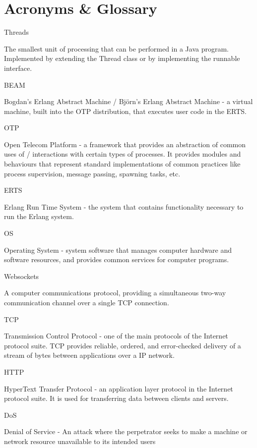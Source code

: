 \documentclass[]{project_plan}
\begin{document}
\chapter{Acronyms \& Glossary}

Threads

The smallest unit of processing that can be performed in a Java program. Implemented by extending the
Thread class or by implementing the runnable interface.

BEAM

Bogdan's Erlang Abstract Machine / Björn's Erlang Abstract Machine - a virtual machine, built into the OTP
distribution, that executes user code in the ERTS.

OTP

Open Telecom Platform - a framework that provides an abstraction of common uses of / interactions with
certain types of processes. It provides modules and behaviours that represent standard implementations of
common practices like process supervision, message passing, spawning tasks, etc.

ERTS

Erlang Run Time System - the system that contains functionality necessary to run the Erlang system.

OS

Operating System - system software that manages computer hardware and software resources, and
provides common services for computer programs.

Websockets

A computer communications protocol, providing a simultaneous two-way communication channel
over a single TCP connection.

TCP

Transmission Control Protocol - one of the main protocols of the Internet protocol suite. TCP provides
reliable, ordered, and error-checked delivery of a stream of bytes between applications over a IP network.

HTTP

HyperText Transfer Protocol - an application layer protocol in the Internet protocol suite.
It is used for transferring data between clients and servers.

DoS

Denial of Service - An attack where the perpetrator seeks to make a machine or network resource unavailable
to its intended users




\end{document}
